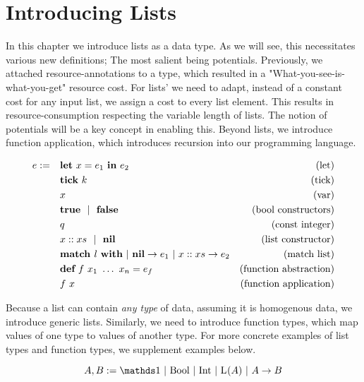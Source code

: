 \chapter{Introducing Lists}\label{chap:list-tick}

In this chapter we introduce lists as a data type. As we will see, this necessitates various new definitions; The most salient being potentials. Previously, we attached resource-annotations to a type, which resulted in a "What-you-see-is-what-you-get" resource cost. For lists' we need to adapt, instead of a constant cost for any input list, we assign a cost to every list element. This results in resource-consumption respecting the variable length of lists. The notion of potentials will be a key concept in enabling this. Beyond lists, we introduce function application, which introduces recursion into our programming language. 

\begin{definition}
   \label{def:prog-lang-6}

\begin{align*}
   e := ~~~ & \mathbf{let}~x = e_1~\mathbf{in}~e_2		& \text{(let)}\\
            & \mathbf{tick}~k				& \text{(tick)}\\
	    & x					& \text{(var)}\\
	    & \mathbf{true} ~~| ~~\mathbf{false}		& \text{(bool constructors)}\\
	    & q					& \text{(const integer)}\\
            & x :: xs ~~| ~~ \textbf{nil}      & \text{(list constructor)}\\
            & \textbf{match } l~\textbf{with}~|~\textbf{nil} \to e_1~|~x :: xs \to e_2           & \text{(match list)}\\
            & \textbf{def}~f~x_1~\dots~x_n = e_f       & \text{(function abstraction)}\\
            & f~x                               & \text{(function application)}\\
\end{align*}
\end{definition}

Because a list can contain \emph{any type} of data, assuming it is homogenous data, we introduce generic lists. Similarly, we need to introduce function types, which map values of one type to values of another type. For more concrete examples of list types and function types, we supplement examples below.

\begin{definition}\label{def:type-system-6}
   \[
      A, B := \unit~|~\text{\bool}~|~\text{\typeint}~|~\ralist{}{A}~|~\rafunc{A}{B}{}{}
   \]
\end{definition}

